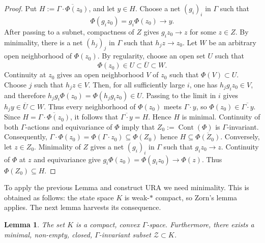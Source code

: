 \documentclass[12pt]{amsart} %
\theoremstyle{plain}
\newtheorem{lemma}[theorem]{Lemma}
\theoremstyle{definition}
\begin{document}
\begin{proof}
Put $H:=\overline{\Gamma\cdot\Phi(z_0)}$, and let $y\in H$.  Choose a net
$(g_i)_i$ in $\Gamma$ such that
\[
\Phi(g_i z_0)=g_i\Phi(z_0)\longrightarrow y.
\]
After passing to a subnet, compactness of $Z$ gives $g_i z_0\to z$ for some
$z\in Z$.  By minimality, there is a net $(h_j)_j$ in $\Gamma$ such that
$h_jz\to z_0$.
Let $W$ be an arbitrary open neighborhood of $\Phi(z_0)$.  By regularity,
choose an open set $U$ such that
\[
\Phi(z_0)\in U\subset\overline U\subset W.
\]
Continuity at $z_0$ gives an open neighborhood $V$ of $z_0$ such that
$\Phi(V)\subset U$.  Choose $j$ such that $h_jz\in V$.  Then, for all
sufficiently large $i$, one has $h_jg_i z_0\in V$, and therefore $h_jg_i\Phi(z_0)=\Phi(h_jg_i z_0)\in U$. Passing to the limit in $i$ gives $h_jy\in\overline U\subset W$.  Thus every
neighborhood of $\Phi(z_0)$ meets $\Gamma\cdot y$, so $\Phi(z_0)\in\overline{\Gamma\cdot y}$. Since $H=\overline{\Gamma\cdot\Phi(z_0)}$, it follows that
$\overline{\Gamma\cdot y}=H$.  Hence $H$ is minimal.
\medskip
\noindent Continuity of both $\Gamma$-actions and equivariance of $\Phi$
imply that $Z_0:=\operatorname{Cont}(\Phi)$ is $\Gamma$-invariant.
Consequently, $\Gamma\cdot\Phi(z_0)=\Phi(\Gamma\cdot z_0)\subseteq\Phi(Z_0)$
hence $H\subseteq\overline{\Phi(Z_0)}$. Conversely, let $z\in Z_0$.
Minimality of $Z$ gives a net $(g_i)_i$ in $\Gamma$ such that
$g_iz_0\to z$. Continuity of $\Phi$ at $z$ and equivariance give
$g_i\Phi(z_0)=\Phi(g_iz_0)\longrightarrow\Phi(z)$.
Thus $\Phi(Z_0)\subseteq H$.
\end{proof}
\noindent To apply the previous Lemma and construct URA we need minimality. This is obtained as follows: the state space $K$ is weak-$*$ compact, so Zorn's lemma applies. The next lemma harvests its consequence.
\begin{lemma}\label{lem:hypertrace-space}The set $K$ is a compact, convex $\Gamma$-space. Furthermore, there exists a minimal, non-empty, closed, $\Gamma$-invariant subset $\mathcal{Z} \subset K$.\end{lemma}%
\end{document}
